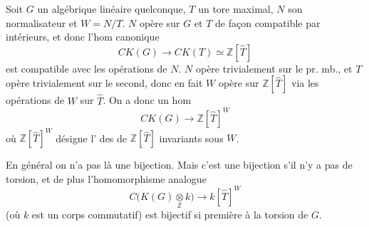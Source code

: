 Soit $G$ un   algébrique linéaire quelconque,
$T$ un tore maximal, $N$ son normalisateur et $W=N/T$.
 $N$ opère sur $G$ et $T$ de façon compatible par
 intérieurs, et  donc  l'hom canonique
\[ CK(G)\longrightarrow CK(T)\simeq\mathbb Z[\widehat T] \]
est compatible avec les opérations de $N$. $N$ opère
trivialement sur le pr. mb., et $T$ opère trivialement
sur le second, donc en fait $W$ opère sur
$\mathbb Z[\widehat T]$ via les opérations de $W$ sur $\widehat T$. On
a donc un hom
\[ CK(G)\longrightarrow\mathbb Z[\widehat T]^W \tag*{(5)} \]
où $\mathbb Z[\widehat T]^W$ désigne l' des  de
$\mathbb Z[\widehat T]$ invariants sous $W$.

 En général  on n'a
pas là une bijection. Mais c'est  une bijection
s'il n'y a pas de torsion,  et de
plus l'homomorphisme analogue
\[ C\bigl(K(G)\mathbin{\underset{\mathbb Z}{\otimes}}k\bigr)\longrightarrow k[\widehat T]^W \tag*{(5 bis)} \]
(où $k$ est un corps commutatif) est bijectif
si   première à la torsion de $G$.

